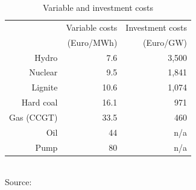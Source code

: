 \begin{table}[htb]
\centering
\caption{Variable and investment costs}
\vspace{0.3cm}
\begin{tabular}{rrr}
\hline
           & Variable costs & Investment costs\\
           &  (Euro/MWh)    &  (Euro/GW) \\
\hline\hline
     Hydro &        7.6 &    3,500\\

   Nuclear &        9.5 &    1,841 \\

   Lignite &       10.6 &    1,074 \\

 Hard coal &       16.1 &     971 \\

 Gas (CCGT) &       33.5 &     460 \\

Oil & 44            &   n/a\\

Pump &         80 &       n/a\\
\hline
\end{tabular}
\label{tab:costs}
\\
\vspace{0.3cm}
\scriptsize Source: \cite{Auer2006}
\end{table}



